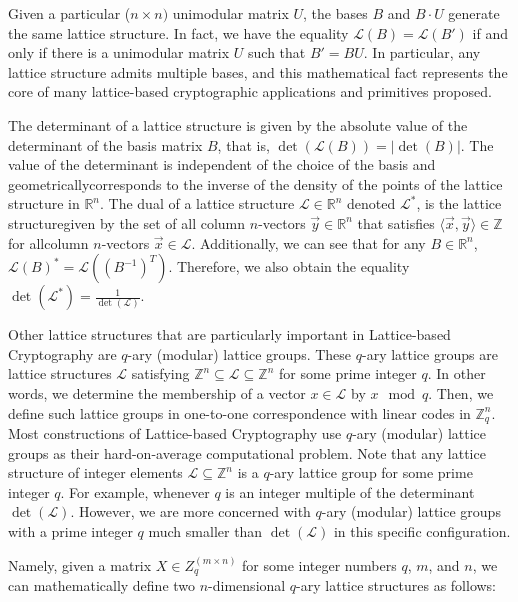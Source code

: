 \documentclass[runningheads]{llncs}
\numberwithin{equation}{section}
\begin{document}
    \noindent Given a particular ($n \times n)$ unimodular matrix $U$, the bases $B$ and $B \cdot U$ generate the same lattice structure. In fact, we have the equality $\mathcal{L}(B) = \mathcal{L}(B')$ if and only if there is a unimodular matrix $U$ such that $B' = BU$. In particular, any lattice structure admits multiple bases, and this mathematical fact represents the core of many lattice-based cryptographic applications and primitives proposed. 

    The determinant of a lattice structure is given by the absolute value of the determinant of the basis matrix $B$, that is, $\det(\mathcal{L}(B)) = |\det(B)|$. The value of the determinant is independent of the choice of the basis and geometrically\break corresponds to the inverse of the density of the points of the lattice structure in ${\mathbb{R}}^{n}$. The dual of a lattice structure $\mathcal{L} \in {\mathbb{R}}^{n}$ denoted ${\mathcal{L}}^{*}$, is the lattice structure\break given by the set of all column $n$-vectors $\Vec{y} \in {\mathbb{R}}^{n}$ that satisfies $\langle \Vec{x}, \Vec{y} \rangle \in \mathbb{Z}$ for all\break column $n$-vectors $\Vec{x} \in \mathcal{L}$. Additionally, we can see that for any $B \in {\mathbb{R}}^{n}$,\break ${\mathcal{L}(B)}^{*} = \mathcal{L}({({B}^{-1})}^{T})$. Therefore, we also obtain the equality $\det({\mathcal{L}}^{*}) = \frac{1}{\det(\mathcal{L})}$. 
    
    Other lattice structures that are particularly important in Lattice-based Cryptography are $q$-ary (modular) lattice groups. These $q$-ary lattice groups are lattice structures $\mathcal{L}$ satisfying ${\mathbb{Z}}^{n} \subseteq \mathcal{L} \subseteq {\mathbb{Z}}^{n}$ for some prime integer $q$. In other words, we determine the membership of a vector $x \in \mathcal{L}$ by $x \mod q$. Then, we define such lattice groups in one-to-one correspondence with linear codes in ${\mathbb{Z}}^{n}_{q}$. Most constructions of Lattice-based Cryptography use $q$-ary (modular) lattice groups as their hard-on-average computational problem. Note that any lattice structure of integer elements $\mathcal{L} \subseteq {\mathbb{Z}}^{n}$ is a $q$-ary lattice group for some prime integer $q$. For example, whenever $q$ is an integer multiple of the determinant $\det(\mathcal{L})$. However, we are more concerned with $q$-ary (modular) lattice groups with a prime integer $q$ much smaller than $\det(\mathcal{L})$ in this specific configuration.

    \noindent Namely, given a matrix $X \in {Z}^{(m \times n)}_{q}$ for some integer numbers $q$, $m$, and $n$, we can mathematically define two $n$-dimensional $q$-ary lattice structures as follows:
    
\end{document}
